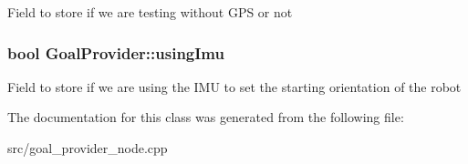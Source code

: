 \-Field to store if we are testing without \-G\-P\-S or not \hypertarget{classGoalProvider_a344bf023e320a812a824654c69531f31}{
\subsubsection[{using\-Imu}]{\setlength{\rightskip}{0pt plus 5cm}bool {\bf \-Goal\-Provider\-::using\-Imu}}}\label{classGoalProvider_a344bf023e320a812a824654c69531f31}
\-Field to store if we are using the \-I\-M\-U to set the starting orientation of the robot 

\-The documentation for this class was generated from the following file\-:\begin{DoxyCompactItemize}
\item 
src/goal\-\_\-provider\-\_\-node.\-cpp\end{DoxyCompactItemize}
